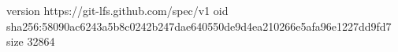 version https://git-lfs.github.com/spec/v1
oid sha256:58090ac6243a5b8c0242b247dae640550de9d4ea210266e5afa96e1227dd9fd7
size 32864
